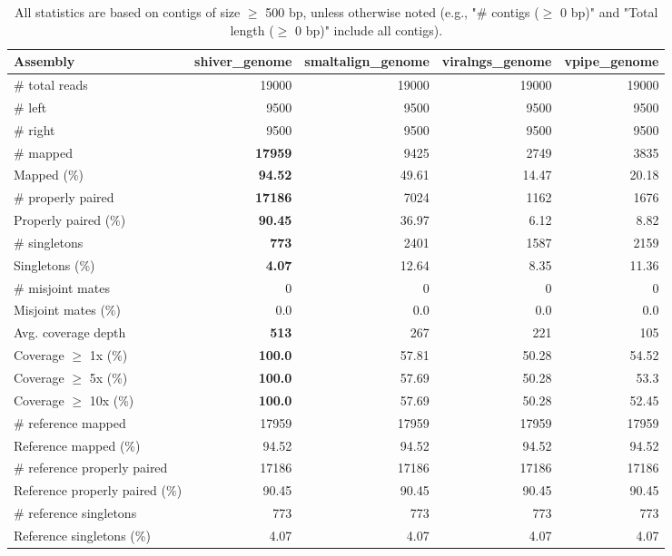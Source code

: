 \documentclass[12pt,a4paper]{article}
\begin{document}
\begin{table}[ht]
\begin{center}
\caption{All statistics are based on contigs of size $\geq$ 500 bp, unless otherwise noted (e.g., "\# contigs ($\geq$ 0 bp)" and "Total length ($\geq$ 0 bp)" include all contigs).}
\begin{tabular}{|l*{4}{|r}|}
\hline
Assembly & shiver\_genome & smaltalign\_genome & viralngs\_genome & vpipe\_genome \\ \hline
\# total reads & 19000 & 19000 & 19000 & 19000 \\ \hline
\# left & 9500 & 9500 & 9500 & 9500 \\ \hline
\# right & 9500 & 9500 & 9500 & 9500 \\ \hline
\# mapped & {\bf 17959} & 9425 & 2749 & 3835 \\ \hline
Mapped (\%) & {\bf 94.52} & 49.61 & 14.47 & 20.18 \\ \hline
\# properly paired & {\bf 17186} & 7024 & 1162 & 1676 \\ \hline
Properly paired (\%) & {\bf 90.45} & 36.97 & 6.12 & 8.82 \\ \hline
\# singletons & {\bf 773} & 2401 & 1587 & 2159 \\ \hline
Singletons (\%) & {\bf 4.07} & 12.64 & 8.35 & 11.36 \\ \hline
\# misjoint mates & 0 & 0 & 0 & 0 \\ \hline
Misjoint mates (\%) & 0.0 & 0.0 & 0.0 & 0.0 \\ \hline
Avg. coverage depth & {\bf 513} & 267 & 221 & 105 \\ \hline
Coverage $\geq$ 1x (\%) & {\bf 100.0} & 57.81 & 50.28 & 54.52 \\ \hline
Coverage $\geq$ 5x (\%) & {\bf 100.0} & 57.69 & 50.28 & 53.3 \\ \hline
Coverage $\geq$ 10x (\%) & {\bf 100.0} & 57.69 & 50.28 & 52.45 \\ \hline
\# reference mapped & 17959 & 17959 & 17959 & 17959 \\ \hline
Reference mapped (\%) & 94.52 & 94.52 & 94.52 & 94.52 \\ \hline
\# reference properly paired & 17186 & 17186 & 17186 & 17186 \\ \hline
Reference properly paired (\%) & 90.45 & 90.45 & 90.45 & 90.45 \\ \hline
\# reference singletons & 773 & 773 & 773 & 773 \\ \hline
Reference singletons (\%) & 4.07 & 4.07 & 4.07 & 4.07 \\ \hline

\end{tabular}
\end{center}
\end{table}
\end{document}
